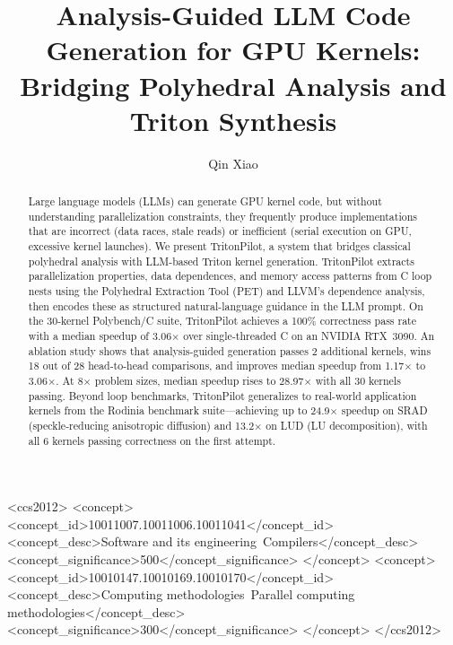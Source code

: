 \documentclass[sigconf]{acmart}
\newcommand{\sysname}{TritonPilot\xspace}
\begin{document}
\title{Analysis-Guided LLM Code Generation for GPU Kernels:\\Bridging Polyhedral Analysis and Triton Synthesis}

\author{Qin Xiao}


\begin{abstract}
Large language models (LLMs) can generate GPU kernel code, but without
understanding parallelization constraints, they frequently produce
implementations that are incorrect (data races, stale reads) or
inefficient (serial execution on GPU, excessive kernel launches). We
present \sysname, a system that bridges classical polyhedral analysis
with LLM-based Triton kernel generation.  \sysname extracts
parallelization properties, data dependences, and memory access patterns
from C loop nests using the Polyhedral Extraction Tool (PET) and LLVM's
dependence analysis, then encodes these as structured natural-language
guidance in the LLM prompt.  On the 30-kernel Polybench/C suite,
\sysname achieves a 100\% correctness pass rate with a median speedup of
3.06$\times$ over single-threaded C on an NVIDIA RTX~3090.  An ablation
study shows that analysis-guided generation passes 2 additional kernels,
wins 18 out of 28 head-to-head comparisons, and improves median speedup
from 1.17$\times$ to 3.06$\times$.  At 8$\times$ problem sizes, median
speedup rises to 28.97$\times$ with all 30 kernels passing.
Beyond loop benchmarks, \sysname generalizes to real-world application
kernels from the Rodinia benchmark suite---achieving up to
24.9$\times$ speedup on SRAD (speckle-reducing anisotropic diffusion)
and 13.2$\times$ on LUD (LU decomposition), with all 6 kernels
passing correctness on the first attempt.
\end{abstract}

\begin{CCSXML}
<ccs2012>
  <concept>
    <concept_id>10011007.10011006.10011041</concept_id>
    <concept_desc>Software and its engineering~Compilers</concept_desc>
    <concept_significance>500</concept_significance>
  </concept>
  <concept>
    <concept_id>10010147.10010169.10010170</concept_id>
    <concept_desc>Computing methodologies~Parallel computing methodologies</concept_desc>
    <concept_significance>300</concept_significance>
  </concept>
</ccs2012>
\end{CCSXML}
\end{document}
